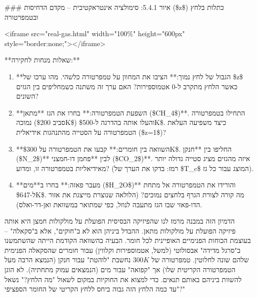 \documentclass[
  hebrew,
  letterpaper,
  DIV=11,
  numbers=noendperiod]{scrreprt}
\begin{document}
\begin{tcolorbox}[enhanced jigsaw, colback=white, arc=.35mm, coltitle=black, breakable, toptitle=1mm, leftrule=.75mm, colbacktitle=quarto-callout-note-color!10!white, opacitybacktitle=0.6, bottomtitle=1mm, titlerule=0mm, opacityback=0, colframe=quarto-callout-note-color-frame, title={הערה}, rightrule=.15mm, bottomrule=.15mm, toprule=.15mm, left=2mm]

\#\#\# איור 5.4.1: סימולציה אינטראקטיבית -- מקדם הדחיסות (\$z\$) כתלות
בלחץ ובטמפרטורה

\textless iframe src="real-gas.html" width="100\%" height="600px"
style="border:none;"\textgreater\textless/iframe\textgreater{}

**שאלות מנחות לחקירה:**

\begin{enumerate}
\def\labelenumi{\arabic{enumi}.}
\item
  **הגבול של לחץ נמוך:** הציבו את המחוון על טמפרטורה כלשהי. מהו ערכו של
  \$z\$ כאשר הלחץ מתקרב ל-0 אטמוספירות? האם ערך זה משתנה כשמחליפים בין
  הגזים השונים?
\item
  **השפעת הטמפרטורה:** בחרו את הגז **מתאן (\$CH\_4\$)**. התחילו
  בטמפרטורה נמוכה (סביב \$200K\$) והעלו אותה בהדרגה ל-\$500K\$. כיצד
  משפיעה העלאת הטמפרטורה על הסטייה מהתנהגות אידיאלית (\$z=1\$)?
\item
  **השוואה בין חומרים:** קבעו את הטמפרטורה על \$300K\$. החליפו בין
  **חנקן (\$N\_2\$)** לבין **פחמן דו-חמצני (\$CO\_2\$)**. איזה מהגזים
  מציג סטייה גדולה יותר מאידיאליות בטמפרטורה זו, ומדוע? (רמז: בדקו את
  הערך של \$T\_c\$ המוצג עבור כל גז).
\item
  **מעבר פאזה:** בחרו ב**מים (\$H\_2O\$)** והורידו את הטמפרטורה אל מתחת
  ל-\$647K\$. מה קורה לצורת הגרף בלחצים נמוכים? (הלולאה שנוצרת מייצגת את
  אזור הדו-פאזי שבו הגז מתעבה לנוזל, כפי שמתואר במשוואת ואן-דר-ואלס).
\end{enumerate}

\end{tcolorbox}

הדמיון הזה במבנה מרמז לנו שהפיזיקה הבסיסית הפועלת על מולקולות חמצן היא
אותה פיזיקה הפועלת על מולקולות מתאן. ההבדל ביניהן הוא לא ב"חוקים", אלא
ב"סקאלה" -- בעוצמת הכוחות הפנימיים האופיינית לכל חומר. הבעיה בהשוואה
הקודמת הייתה שהשתמשנו ב"סרגל מדידה" אבסולוטי (למשל, אטמוספירות וקלווין)
עבור חומרים שהסקאלה הפנימית שלהם שונה לחלוטין. טמפרטורה של \(300K\)
נחשבת "לוהטת" עבור חנקן (הנמצא הרבה מעל הטמפרטורה הקריטית שלו) אך
"קפואה" עבור מים (הנמצאים עמוק מתחתיה). לא הוגן להשוות ביניהם באותם
תנאים. כדי למצוא את החוקיות במקום לשאול "מה הלחץ?" נשאל "עד כמה הלחץ הזה
גבוה ביחס ללחץ הקריטי של החומר הספציפי?"
\end{document}

